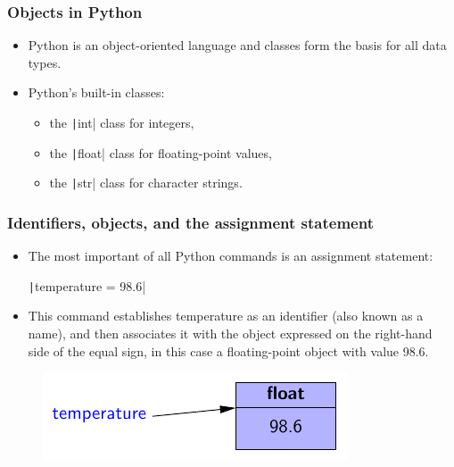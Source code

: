 \begin{frame}
    \frametitle{Objects in Python}

    \begin{itemize}
        \item Python is an object-oriented language and classes form the basis for all data types.
        \item Python's built-in classes:
              \begin{itemize}
                  \item the \texttt|int| class for integers,
                  \item the \texttt|float| class for floating-point values,
                  \item the \texttt|str| class for character strings.
              \end{itemize}
    \end{itemize}

\end{frame}

\begin{frame}[fragile]
    \frametitle{Identifiers, objects, and the assignment statement}

    \begin{itemize}
        \item The most important of all Python commands is an assignment statement:
              \begin{center}
                  \texttt|temperature = 98.6|
              \end{center}
        \item This command establishes temperature as an identifier (also known as a name), and then associates it with the object expressed on the right-hand side of the equal sign, in this case a floating-point object with value 98.6.

    \end{itemize}

    \begin{figure}
        \centering
        \includegraphics{../images/figure-1.1.pdf}
    \end{figure}

\end{frame}

